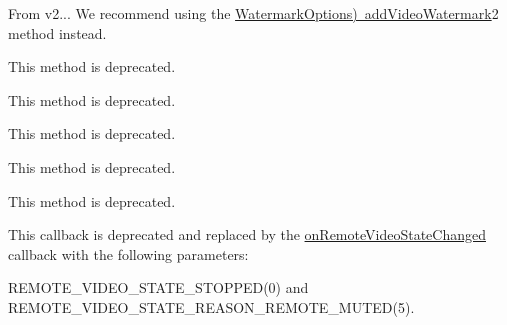 \begin{DoxyRefList}
%
From v2... We recommend using the \mbox{\hyperlink{}{Watermark\+Options) add\+Video\+Watermark}}2 method instead. 
\item[Member \mbox{\hyperlink{classio_1_1agora_1_1rtc2_1_1_rtc_engine_a80f3483745062772033c0b6b7aba724a}{io.agora.rtc2.Rtc\+Engine.set\+Encryption\+Secret}} (String secret)]\label{deprecated__deprecated000032}%
%
This method is deprecated. 
\item[Member \mbox{\hyperlink{classio_1_1agora_1_1rtc2_1_1_rtc_engine_ae3ca33f4e5ab09c5e4d2979c4bef5dc6}{io.agora.rtc2.Rtc\+Engine.set\+Encryption\+Mode}} (String encryption\+Mode)]\label{deprecated__deprecated000033}%
%
This method is deprecated. 
\item[Member \mbox{\hyperlink{classio_1_1agora_1_1rtc2_1_1_rtc_engine_a6186606062e5fbe0ff3c6d67c50e68aa}{io.agora.rtc2.Rtc\+Engine.get\+Recommended\+Encoder\+Type}} ()]\label{deprecated__deprecated000034}%
%
This method is deprecated. 
\item[Member \mbox{\hyperlink{classio_1_1agora_1_1rtc2_1_1_rtc_engine_abdacfc92faddfb139a7494994f7eb54a}{io.agora.rtc2.Rtc\+Engine.enable\+High\+Perf\+Wifi\+Mode}} (boolean enable)]\label{deprecated__deprecated000035}%
%
This method is deprecated.  
\item[Member \mbox{\hyperlink{classio_1_1agora_1_1rtc2_1_1_rtc_engine_a13c23e98808f778c48dcd1eb03d4062b}{io.agora.rtc2.Rtc\+Engine.set\+Prefer\+Headset}} (boolean enabled)]\label{deprecated__deprecated000036}%
%
This method is deprecated.  
\item[Member \mbox{\hyperlink{classio_1_1agora_1_1rtc2_1_1_i_rtc_engine_event_handler_a9e43e9e2b70a0d4b20a0e0313a734c90}{io.agora.rtc2.I\+Rtc\+Engine\+Event\+Handler.on\+User\+Enable\+Local\+Video}} (int uid, boolean enabled)]\label{deprecated__deprecated000010}%
%
 This callback is deprecated and replaced by the \mbox{\hyperlink{classio_1_1agora_1_1rtc2_1_1_i_rtc_engine_event_handler_a5daae97f78becbf71dc3dbfd494f8419}{on\+Remote\+Video\+State\+Changed}} callback with the following parameters\+:
\begin{DoxyItemize}
\item {\ttfamily R\+E\+M\+O\+T\+E\+\_\+\+V\+I\+D\+E\+O\+\_\+\+S\+T\+A\+T\+E\+\_\+\+S\+T\+O\+P\+P\+E\+D(0)} and {\ttfamily R\+E\+M\+O\+T\+E\+\_\+\+V\+I\+D\+E\+O\+\_\+\+S\+T\+A\+T\+E\+\_\+\+R\+E\+A\+S\+O\+N\+\_\+\+R\+E\+M\+O\+T\+E\+\_\+\+M\+U\+T\+E\+D(5)}.

\end{DoxyItemize}
\end{DoxyRefList}
